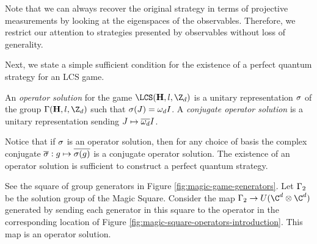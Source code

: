 Note that we can always recover the original strategy in terms of projective measurements by looking at the eigenspaces of the observables. Therefore, we restrict our attention to strategies presented by observables without loss of generality. 

Next, we state a simple sufficient condition for the existence of a perfect quantum strategy for an LCS game.

\begin{definition}
	An \emph{operator solution} for the game $\LCS(\mathbf H, l, \Z_d)$ is a unitary representation $\sigma$ of the group $\G(\mathbf H, l, \Z_d)$ such that $\sigma(J) = \omega_dI$. A \emph{conjugate operator solution} is a unitary representation sending $J\mapsto \overline{\omega_d}I$. 
\end{definition}

Notice that if $\sigma$ is an operator solution, then for any choice of basis the complex conjugate $\overline{\sigma}: g\mapsto \overline{\sigma(g)}$ is a conjugate operator solution. The existence of an operator solution is sufficient to construct a perfect quantum strategy. 

\begin{example}
See the square of group generators in Figure \ref{fig:magic-game-generators}. Let $\Gamma_2$ be the solution group of the Magic Square. Consider the map $\G_2 \to U(\C^d\otimes \C^d)$ generated by sending each generator in this square to the operator in the corresponding location of Figure \ref{fig:magic-square-operators-introduction}. This map is an operator solution.
\end{example}

